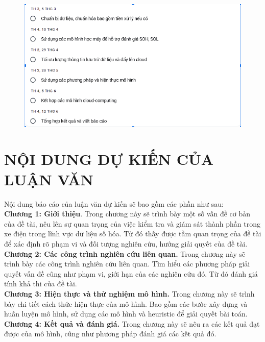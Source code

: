 \documentclass[a4paper,11pt]{article}
\theoremstyle{mytheor}
\begin{document}
\begin{figure}[h]
\begin{center}
\includegraphics[width=5in]{plan.png}
\end{center}
\end{figure} 

\vspace{5cm}
\section{NỘI DUNG DỰ KIẾN CỦA LUẬN VĂN}

Nội dung báo cáo của luận văn dự kiến sẽ bao gồm các phần như sau:\\

\textbf{Chương 1: Giới thiệu}. Trong chương này sẽ trình bày một số vấn đề cơ bản của đề tài, nêu lên sự quan trọng của việc kiểm tra và giám sát thành phần trong xe điện trong lĩnh vực dữ liệu số hóa. Từ đó thấy được tầm quan trọng của đề tài để xác định rõ phạm vi và đối tượng nghiên cứu, hướng giải quyết của đề tài.
\\

\textbf{Chương 2: Các công trình nghiên cứu liên quan.} Trong chương này sẽ trình bày các công trình nghiên cứu liên quan. Tìm hiểu các phương pháp giải quyết vấn đề cũng như phạm vi, giới hạn của các nghiên cứu đó. Từ đó đánh giá tính khả thi của đề tài.\\

\textbf{Chương 3: Hiện thực và thử nghiệm mô hình. } Trong chương này sẽ trình bày chi tiết cách thức hiện thực của mô hình. Bao gồm các bước xây dựng và huấn luyện mô hình, sử dụng các mô hình và heuristic để giải quyết bài toán.\\

\textbf{Chương 4: Kết quả và đánh giá.} Trong chương này sẽ nêu ra các kết quả đạt được của mô hình, cũng như phương pháp đánh giá các kết quả đó.\\
\end{document}
